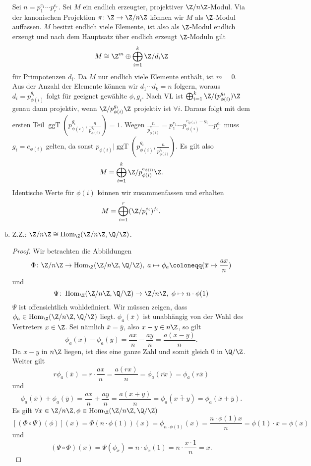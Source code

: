 \documentclass{article}
\newcommand{\ggt}{\operatorname{ggT}}
\renewcommand{\hom}{\operatorname{Hom}}
\begin{document}
\begin{enumerate}[(a)]
    Sei $n = p_1^{e_1} \cdots p_r^{e_r}$. Sei $M$ ein endlich erzeugter, projektiver $\Z/n\Z$-Modul.
    Via der kanonischen Projektion $\pi\colon \Z\to \Z/n\Z$ können wir $M$ als $\Z$-Modul auffassen.
    $M$ besitzt endlich viele Elemente, ist also als $\Z$-Modul endlich erzeugt und nach dem Hauptsatz 
    über endlich erzeugt $\Z$-Moduln gilt
    $$M \cong \Z^m \oplus \bigoplus_{i = 1}^k \Z/d_i\Z$$
    für Primpotenzen $d_i$.
    Da $M$ nur endlich viele Elemente enthält, ist $m=0$. Aus der Anzahl der Elemente können wir 
    $d_1 \cdots d_k = n$ folgern, woraus $d_i = p_{\phi(i)}^{g_i}$ folgt für geeignet gewählte $\phi, g_i$.
    Nach VL ist $\bigoplus_{i = 1}^k \Z/(p_{\phi(i)}^{g_i})\Z$ genau dann projektiv, 
    wenn $\Z/p_{\phi(i)}^{g_i}\Z$ projektiv ist $\forall i$.
    Daraus folgt mit dem ersten Teil $\ggt(p_{\phi(i)}^{g_i}, \frac{n}{p_{\phi(i)}^{g_i}}) = 1$.
    Wegen $\frac{n}{p_{\phi(i)}^{g_i}} = p_1^{e_1} \cdots p_{\phi(i)}^{e_{\phi(i)} - g_i} \cdots p_r^{e_r}$
    muss $g_i = e_{\phi(i)}$ gelten, da sonst $p_{\phi(i)} | \ggt(p_{\phi(i)}^{g_i}, \frac{n}{p_{\phi(i)}^{g_i}})$.
    Es gilt also 
    $$M = \bigoplus_{i=1}^k \Z/p_{\phi(i)}^{e_{\phi(i)}}\Z.$$
    Identische Werte für $\phi(i)$ können wir zusammenfassen und erhalten
    $$M = \bigoplus_{i=1}^r (\Z/p_i^{e_i})^{f_i}.$$
    \item Z.Z.: $\Z/n\Z \cong \hom_\Z(\Z/n\Z, \Q/\Z)$.
    \begin{proof}
        Wir betrachten die Abbildungen
        $$\Phi \colon \Z/n\Z \to \hom_\Z(\Z/n\Z, \Q/\Z),\; a \mapsto \phi_a \coloneqq (\overline{x} \mapsto \frac{ax}{n})$$
        und 
        $$\Psi \colon \hom_\Z(\Z/n\Z, \Q/\Z) \to \Z/n\Z,\; \phi \mapsto n \cdot \phi(1)$$
        $\Psi$ ist offensichtlich wohldefiniert.
        Wir müssen zeigen, dass $\phi_a \in \hom_\Z(\Z/n\Z, \Q/\Z)$ liegt.
        $\phi_a(\overline{x})$ ist unabhängig von der Wahl des Vertreters $x \in \Z$. Sei nämlich $\overline{x} = \overline{y}$, 
        also $x-y \in n\Z$, so gilt 
        $$\phi_a(x) - \phi_a(y) = \frac{ax}{n} - \frac{ay}{n} = \frac{a(x-y)}{n}.$$
        Da $x-y$ in $n\Z$ liegen, ist dies eine ganze Zahl und somit gleich 0 in $\Q/\Z$. Weiter gilt
        $$r \phi_a(\overline{x}) = r \cdot \frac{ax}{n} = \frac{a(rx)}{n} = \phi_a(\overline{rx}) = \phi_a(r\overline{x})$$
        und $$\phi_a(\overline{x}) + \phi_a(\overline{y}) = \frac{ax}{n} + \frac{ay}{n} = \frac{a(x + y)}{n} 
        = \phi_a(\overline{x+y}) = \phi_a(\overline{x} + \overline{y}).$$
        Es gilt $\forall x \in \Z/n\Z, \phi \in \hom_\Z(\Z/n\Z, \Q/\Z)$
        $$ [(\Phi \circ \Psi)(\phi)](x) = \Phi(n \cdot \phi(1))(x) = \phi_{n\cdot \phi(1)}(x) = \frac{n \cdot \phi(1)x}{n} = \phi(1) \cdot x = \phi(x)$$
        und
        $$ (\Psi \circ \Phi)(x) = \Psi(\phi_x) = n \cdot \phi_x(1) = n \cdot \frac{x \cdot 1 }{n} = x.$$


\end{proof}
\end{enumerate}
\end{document}

